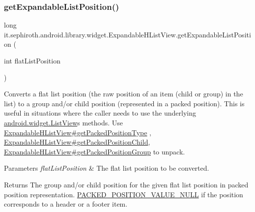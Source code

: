 \subsubsection{\texorpdfstring{get\+Expandable\+List\+Position()}{getExpandableListPosition()}}
{\footnotesize\ttfamily long it.\+sephiroth.\+android.\+library.\+widget.\+Expandable\+H\+List\+View.\+get\+Expandable\+List\+Position (\begin{DoxyParamCaption}\item[{int}]{flat\+List\+Position }\end{DoxyParamCaption})}

Converts a flat list position (the raw position of an item (child or group) in the list) to a group and/or child position (represented in a packed position). This is useful in situations where the caller needs to use the underlying \hyperlink{}{android.\+widget.\+List\+View}\textquotesingle{}s methods. Use \hyperlink{classit_1_1sephiroth_1_1android_1_1library_1_1widget_1_1_expandable_h_list_view_ae574c6efbf83f1bb3d588c13a7bd0ef1}{Expandable\+H\+List\+View\#get\+Packed\+Position\+Type} , \hyperlink{classit_1_1sephiroth_1_1android_1_1library_1_1widget_1_1_expandable_h_list_view_a9325b28ae11af4325839c0a15e640152}{Expandable\+H\+List\+View\#get\+Packed\+Position\+Child}, \hyperlink{classit_1_1sephiroth_1_1android_1_1library_1_1widget_1_1_expandable_h_list_view_ada2257e0f53c0c4dfe19c7e0fa155aad}{Expandable\+H\+List\+View\#get\+Packed\+Position\+Group} to unpack.


\begin{DoxyParams}{Parameters}
{\em flat\+List\+Position} & The flat list position to be converted. \\
\hline
\end{DoxyParams}
\begin{DoxyReturn}{Returns}
The group and/or child position for the given flat list position in packed position representation. \hyperlink{classit_1_1sephiroth_1_1android_1_1library_1_1widget_1_1_expandable_h_list_view_a625409dd43a10f9bee03a2fa43d5243a}{P\+A\+C\+K\+E\+D\+\_\+\+P\+O\+S\+I\+T\+I\+O\+N\+\_\+\+V\+A\+L\+U\+E\+\_\+\+N\+U\+LL} if the position corresponds to a header or a footer item. 
\end{DoxyReturn}
\mbox{\label{classit_1_1sephiroth_1_1android_1_1library_1_1widget_1_1_expandable_h_list_view_a74f94566fd27aaa3a58118a03d5316c9}} 
